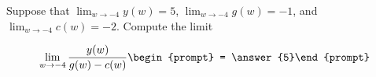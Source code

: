 \documentclass{ximera}
\author{Matthew Carr}
\begin{document}
\begin{exercise}
Suppose that $\lim_{w\to-4}y(w)=5$, $\lim_{w\to-4}g(w)=-1$, and $\lim_{w\to-4}c(w)=-2$. Compute the limit

\[
\lim_{w\to -4 } \frac{y(w)}{g(w)-c(w)}\begin{prompt} = \answer{5}\end{prompt}
\]
\end{exercise}
\end{document}

